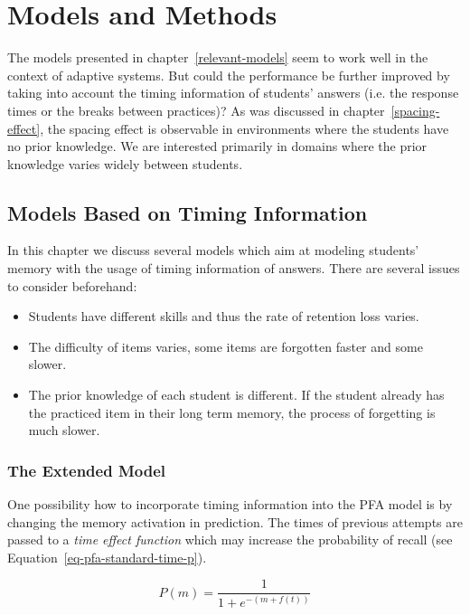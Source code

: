 \chapter{Models and Methods}

The models presented in chapter~\ref{relevant-models} seem to work well in the context of adaptive systems. But could the performance be further improved by taking into account the timing information of students' answers (i.e. the response times or the breaks between practices)? As was discussed in chapter~\ref{spacing-effect}, the spacing effect is observable in environments where the students have no prior knowledge. We are interested primarily in domains where the prior knowledge varies widely between students.

\section{Models Based on Timing Information}

In this chapter we discuss several models which aim at modeling students' memory with the usage of timing information of answers. There are several issues to consider beforehand:

\begin{itemize}
  \item Students have different skills and thus the rate of retention loss varies.
  \item The difficulty of items varies, some items are forgotten faster and some slower.
  \item The prior knowledge of each student is different. If the student already has the practiced item in their long term memory, the process of forgetting is much slower.
\end{itemize}

\subsection{The Extended Model}
\label{pfaet}

One possibility how to incorporate timing information into the PFA model is by changing the memory activation in prediction. The times of previous attempts are passed to a \textit{time effect function} which may increase the probability of recall (see Equation~\ref{eq-pfa-standard-time-p}).

\begin{equation} \label{eq-pfa-standard-time-p}
  P(m) = \frac{1}{1 + e^{-(m + f(t))}}
\end{equation}

